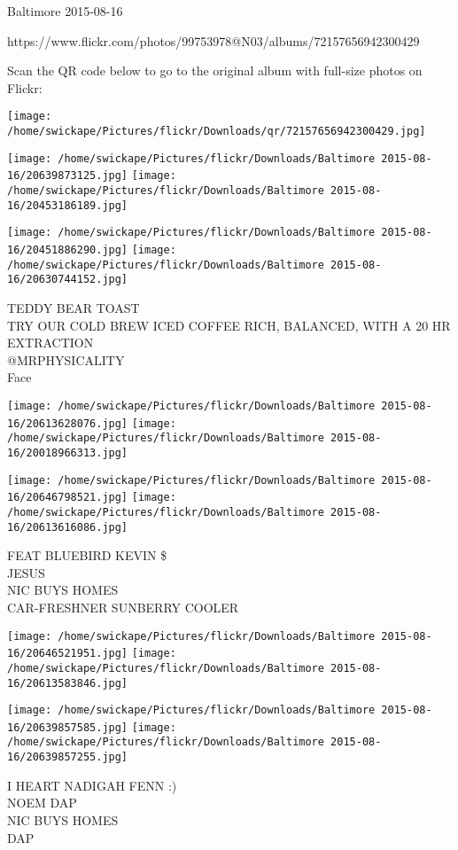 \documentclass[10pt,letterpaper]{article}
\begin{document}
Baltimore 2015-08-16

https://www.flickr.com/photos/99753978@N03/albums/72157656942300429

Scan the QR code below to go to the original album with full-size photos on Flickr:

\texttt{[image: /home/swickape/Pictures/flickr/Downloads/qr/72157656942300429.jpg]}
\pagebreak

\texttt{[image: /home/swickape/Pictures/flickr/Downloads/Baltimore 2015-08-16/20639873125.jpg]}
\texttt{[image: /home/swickape/Pictures/flickr/Downloads/Baltimore 2015-08-16/20453186189.jpg]}

\texttt{[image: /home/swickape/Pictures/flickr/Downloads/Baltimore 2015-08-16/20451886290.jpg]}
\texttt{[image: /home/swickape/Pictures/flickr/Downloads/Baltimore 2015-08-16/20630744152.jpg]}

TEDDY BEAR TOAST\\
TRY OUR COLD BREW ICED COFFEE RICH, BALANCED, WITH A 20 HR EXTRACTION\\
@MRPHYSICALITY\\
Face
\pagebreak

\texttt{[image: /home/swickape/Pictures/flickr/Downloads/Baltimore 2015-08-16/20613628076.jpg]}
\texttt{[image: /home/swickape/Pictures/flickr/Downloads/Baltimore 2015-08-16/20018966313.jpg]}

\texttt{[image: /home/swickape/Pictures/flickr/Downloads/Baltimore 2015-08-16/20646798521.jpg]}
\texttt{[image: /home/swickape/Pictures/flickr/Downloads/Baltimore 2015-08-16/20613616086.jpg]}

FEAT BLUEBIRD KEVIN \$\\
JESUS\\
NIC BUYS HOMES\\
CAR{-}FRESHNER SUNBERRY COOLER
\pagebreak

\texttt{[image: /home/swickape/Pictures/flickr/Downloads/Baltimore 2015-08-16/20646521951.jpg]}
\texttt{[image: /home/swickape/Pictures/flickr/Downloads/Baltimore 2015-08-16/20613583846.jpg]}

\texttt{[image: /home/swickape/Pictures/flickr/Downloads/Baltimore 2015-08-16/20639857585.jpg]}
\texttt{[image: /home/swickape/Pictures/flickr/Downloads/Baltimore 2015-08-16/20639857255.jpg]}

I HEART NADIGAH FENN :)\\
NOEM DAP\\
NIC BUYS HOMES\\
DAP
\pagebreak
\end{document}

